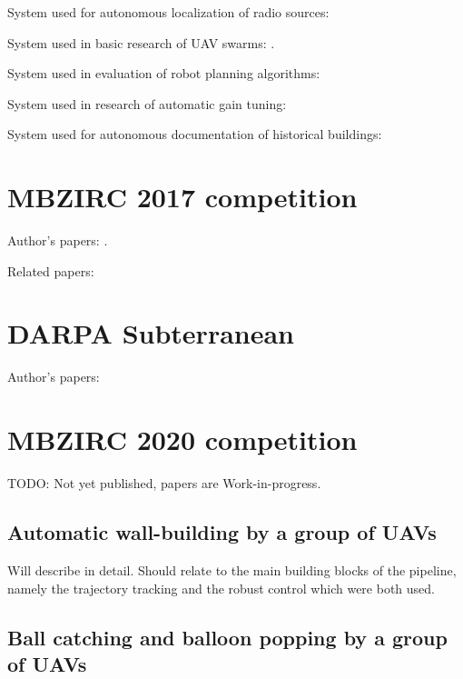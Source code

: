 \documentclass[a4paper,11pt,titlepage,twoside]{book}
\begin{document}
System used for autonomous localization of radio sources: \cite{vrba2019realtime}

System used in basic research of UAV swarms: \cite{saska2020formation}.

System used in evaluation of robot planning algorithms: \cite{penicka2019data, faigl2019unsupervised, penicka2017dubins, spurny2018cooperative, petrlik2019coverage, faigl2017onsolution, spurny2016complex}

System used in research of automatic gain tuning: \cite{giernacky2019realtime}

System used for autonomous documentation of historical buildings: \cite{petracek2020dronument, saska2017documentation}

\section{MBZIRC 2017 competition}

Author's papers: \cite{baca2019autonomous, spurny2018cooperative, loianno2018localization}.

Related papers: \cite{faigl2019unsupervised, stepan2019vision}

\section{DARPA Subterranean}

Author's papers: \cite{petrlik2020robust, roucek2019darpa}

\section{MBZIRC 2020 competition}

TODO: Not yet published, papers are Work-in-progress.

\subsection{Automatic wall-building by a group of UAVs}

Will describe in detail. Should relate to the main building blocks of the pipeline, namely the trajectory tracking \cite{baca2018model} and the robust control \cite{petrlik2020robust} which were both used.

\subsection{Ball catching and balloon popping by a group of UAVs}
\end{document}
